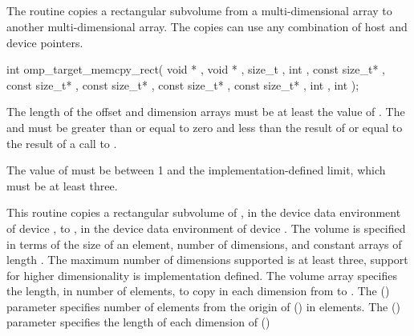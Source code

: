 \pagebreak
{}
\vspace{-1\baselineskip}
\subsection{}
\label{subsec:omp_target_memcpy_rect}
\summary

The  routine copies a rectangular subvolume from
a multi-dimensional array to another multi-dimensional array. The copies can
use any combination of host and device pointers.

\format
\begin{samepage}
\begin{boxedcode}
int omp\_target\_memcpy\_rect(
               void * , void * ,
               size\_t ,
               int ,
               const size\_t* ,
               const size\_t* ,
               const size\_t* ,
               const size\_t* ,
               const size\_t* ,
               int , int );
\end{boxedcode}
\end{samepage}

\constraints
The length of the offset and dimension arrays must be at least the
value of .
The  and 
must be greater than or equal to zero and less than the result of
 or equal to the result of a call to
.

The value of  must be between 1 and the implementation-defined
limit, which must be at least three.


\effect

This routine copies a rectangular subvolume of ,
in the device data environment of device ,
to , in the device data environment of device .
The volume is specified in terms of the size of an element, 
number of dimensions, and constant arrays of length .  The 
maximum number of dimensions supported is at least three, support for higher 
dimensionality is implementation defined. The volume array specifies the 
length, in number of elements, to copy in each dimension from  
to . The  () parameter specifies
number of elements from the origin of  () in elements.  
The  () parameter specifies the 
length of each dimension of  ()

